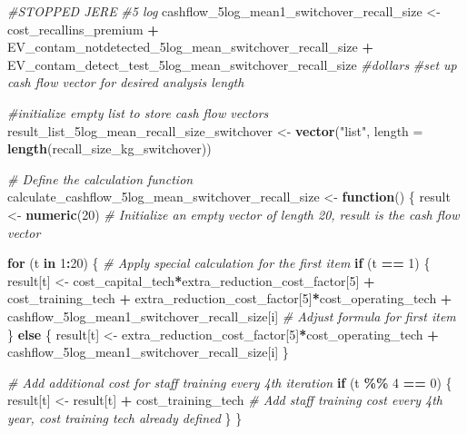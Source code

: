 \documentclass[
]{article}
\newenvironment{Shaded}{\begin{snugshade}}{\end{snugshade}}
\newcommand{\AttributeTok}[1]{\textcolor[rgb]{0.13,0.29,0.53}{#1}}
\newcommand{\CommentTok}[1]{\textcolor[rgb]{0.56,0.35,0.01}{\textit{#1}}}
\newcommand{\ControlFlowTok}[1]{\textcolor[rgb]{0.13,0.29,0.53}{\textbf{#1}}}
\newcommand{\DecValTok}[1]{\textcolor[rgb]{0.00,0.00,0.81}{#1}}
\newcommand{\FunctionTok}[1]{\textcolor[rgb]{0.13,0.29,0.53}{\textbf{#1}}}
\newcommand{\NormalTok}[1]{#1}
\newcommand{\OtherTok}[1]{\textcolor[rgb]{0.56,0.35,0.01}{#1}}
\newcommand{\SpecialCharTok}[1]{\textcolor[rgb]{0.81,0.36,0.00}{\textbf{#1}}}
\newcommand{\StringTok}[1]{\textcolor[rgb]{0.31,0.60,0.02}{#1}}
\begin{document}
\begin{Shaded}
\begin{Highlighting}[]
\CommentTok{\#STOPPED JERE}
\CommentTok{\#5 log}
\NormalTok{cashflow\_5log\_mean1\_switchover\_recall\_size }\OtherTok{\textless{}{-}}\NormalTok{ cost\_recallins\_premium }\SpecialCharTok{+}\NormalTok{ EV\_contam\_notdetected\_5log\_mean\_switchover\_recall\_size }\SpecialCharTok{+}\NormalTok{ EV\_contam\_detect\_test\_5log\_mean\_switchover\_recall\_size }\CommentTok{\#dollars}
\CommentTok{\#set up cash flow vector for desired analysis length}

\CommentTok{\#initialize empty list to store cash flow vectors}
\NormalTok{result\_list\_5log\_mean\_recall\_size\_switchover }\OtherTok{\textless{}{-}} \FunctionTok{vector}\NormalTok{(}\StringTok{"list"}\NormalTok{, }\AttributeTok{length =} \FunctionTok{length}\NormalTok{(recall\_size\_kg\_switchover))}


\CommentTok{\# Define the calculation function}
\NormalTok{calculate\_cashflow\_5log\_mean\_switchover\_recall\_size }\OtherTok{\textless{}{-}} \ControlFlowTok{function}\NormalTok{() \{}
\NormalTok{  result }\OtherTok{\textless{}{-}} \FunctionTok{numeric}\NormalTok{(}\DecValTok{20}\NormalTok{)  }\CommentTok{\# Initialize an empty vector of length 20, result is the cash flow vector}
  
  \ControlFlowTok{for}\NormalTok{ (t }\ControlFlowTok{in} \DecValTok{1}\SpecialCharTok{:}\DecValTok{20}\NormalTok{) \{}
    \CommentTok{\# Apply special calculation for the first item}
    \ControlFlowTok{if}\NormalTok{ (t }\SpecialCharTok{==} \DecValTok{1}\NormalTok{) \{}
\NormalTok{      result[t] }\OtherTok{\textless{}{-}}\NormalTok{ cost\_capital\_tech}\SpecialCharTok{*}\NormalTok{extra\_reduction\_cost\_factor[}\DecValTok{5}\NormalTok{] }\SpecialCharTok{+}\NormalTok{ cost\_training\_tech }\SpecialCharTok{+}\NormalTok{ extra\_reduction\_cost\_factor[}\DecValTok{5}\NormalTok{]}\SpecialCharTok{*}\NormalTok{cost\_operating\_tech }\SpecialCharTok{+}\NormalTok{ cashflow\_5log\_mean1\_switchover\_recall\_size[i] }\CommentTok{\# Adjust formula for first item}
\NormalTok{    \} }\ControlFlowTok{else}\NormalTok{ \{}
\NormalTok{      result[t] }\OtherTok{\textless{}{-}}\NormalTok{ extra\_reduction\_cost\_factor[}\DecValTok{5}\NormalTok{]}\SpecialCharTok{*}\NormalTok{cost\_operating\_tech }\SpecialCharTok{+}\NormalTok{ cashflow\_5log\_mean1\_switchover\_recall\_size[i]}
\NormalTok{    \}}
    
    \CommentTok{\# Add additional cost for staff training every 4th iteration}
    \ControlFlowTok{if}\NormalTok{ (t }\SpecialCharTok{\%\%} \DecValTok{4} \SpecialCharTok{==} \DecValTok{0}\NormalTok{) \{}
\NormalTok{      result[t] }\OtherTok{\textless{}{-}}\NormalTok{ result[t] }\SpecialCharTok{+}\NormalTok{ cost\_training\_tech  }\CommentTok{\# Add staff training cost every 4th year, cost training tech already defined}
\NormalTok{    \}}
\NormalTok{  \}}
  

\end{Highlighting}
\end{Shaded}
\end{document}
